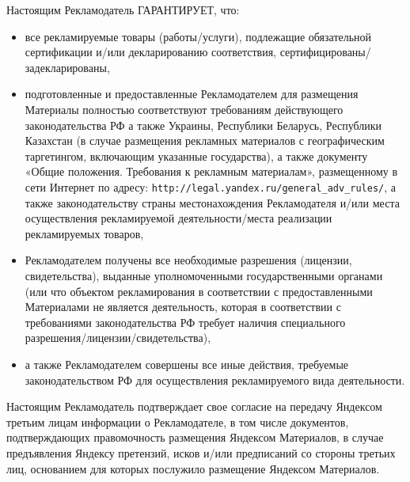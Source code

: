 \noindent
    Настоящим Рекламодатель ГАРАНТИРУЕТ, что:
\begin{itemize}
    \item все рекламируемые товары (работы/услуги), подлежащие обязательной сертификации и/или декларированию соответствия, сертифицированы/задекларированы,
    \item подготовленные и предоставленные Рекламодателем для размещения Материалы полностью соответствуют требованиям действующего законодательства РФ а также Украины, Республики Беларусь, Республики Казахстан (в случае размещения рекламных материалов с географическим таргетингом, включающим указанные государства), а также документу «Общие положения. Требования к рекламным материалам», размещенному в сети Интернет по адресу: \lb \verb|http://legal.yandex.ru/general_adv_rules/|, а также законодательству страны местонахождения Рекламодателя и/или места осуществления рекламируемой деятельности/места реализации рекламируемых товаров,
    \item Рекламодателем получены все необходимые разрешения (лицензии, свидетельства), выданные уполномоченными государственными органами (или что объектом рекламирования в соответствии с предоставленными Материалами не является деятельность, которая в соответствии с требованиями законодательства РФ требует наличия специального разрешения/лицензии/свидетельства),
    \item а также Рекламодателем совершены все иные действия, требуемые законодательством РФ для осуществления рекламируемого вида деятельности.
\end{itemize}

\noindent
    Настоящим Рекламодатель подтверждает свое согласие на передачу Яндексом третьим лицам информации о Рекламодателе, в том числе документов, подтверждающих правомочность размещения Яндексом Материалов, в случае предъявления Яндексу претензий, исков и/или предписаний со стороны третьих лиц, основанием для которых послужило размещение Яндексом Материалов.
\vspace{0.5em}

